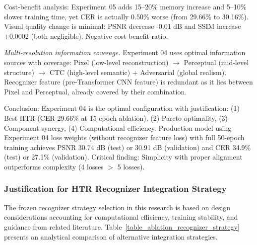 \documentclass[journal]{IEEEtran}
\begin{document}
Cost-benefit analysis: Experiment 05 adds 15--20\% memory increase and 5--10\% slower training time, yet CER is actually 0.50\% worse (from 29.66\% to 30.16\%). Visual quality change is minimal: PSNR decrease -0.01 dB and SSIM increase +0.0002 (both negligible). Negative cost-benefit ratio.

\textit{Multi-resolution information coverage.} Experiment 04 uses optimal information sources with coverage: Pixel (low-level reconstruction) $\rightarrow$ Perceptual (mid-level structure) $\rightarrow$ CTC (high-level semantic) + Adversarial (global realism). Recognizer feature (pre-Transformer CNN feature) is redundant as it lies between Pixel and Perceptual, already covered by their combination.

Conclusion: Experiment 04 is the optimal configuration with justification: (1) Best HTR (CER 29.66\% at 15-epoch ablation), (2) Pareto optimality, (3) Component synergy, (4) Computational efficiency. Production model using Experiment 04 loss weights (without recognizer feature loss) with full 50-epoch training achieves PSNR 30.74 dB (test) or 30.91 dB (validation) and CER 34.9\% (test) or 27.1\% (validation). Critical finding: Simplicity with proper alignment outperforms complexity (4 losses $>$ 5 losses).

\subsubsection{Justification for HTR Recognizer Integration Strategy}
\label{sec:ablation}

The frozen recognizer strategy selection in this research is based on design considerations accounting for computational efficiency, training stability, and guidance from related literature. Table~\ref{table_ablation_recognizer_strategy} presents an analytical comparison of alternative integration strategies.
\end{document}
